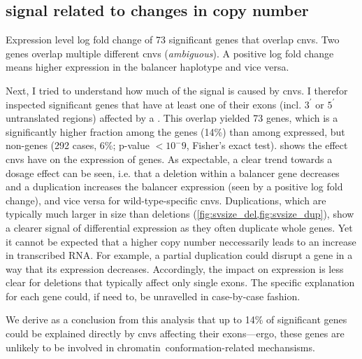 \subsection{\texorpdfstring{\ase}{ASE} signal related to changes in copy number}
\label{sec:balancer_ase_cnvs}

%
%
    {Expression level log fold change of 73 significant \ase genes that overlap
    \acp{cnv}. Two genes overlap multiple different \acp{cnv} (\textit{ambiguous}).
    A positive log fold change means higher expression in the balancer haplotype
    and vice versa.}

Next, I tried to understand how much of the \ase signal is caused by \acp{cnv}.
I therefor inspected significant \ase genes that have at least one of their
exons (incl. $3^\prime$ or $5^\prime$ untranslated regions) affected by a \cnv.
This overlap yielded 73 genes, which is a significantly higher fraction
among the \ase genes (14\%) than among expressed, but non-\ase genes (292 cases,
6\%; p-value $<10^-9$, Fisher's exact test).  shows
the effect \acp{cnv} have on the expression of \ase genes. As expectable, a
clear trend towards a dosage effect can be seen, i.e. that a deletion within a
balancer gene decreases and a duplication increases the balancer
expression (seen by a positive log fold change), and vice versa for
wild-type-specific \acp{cnv}. Duplications, which are typically much larger in
size than deletions (\cref{fig:svsize_del,fig:svsize_dup}), show a
clearer signal of differential expression as they often duplicate whole genes.
Yet it cannot be expected that a higher copy number neccessarily leads to an
increase in transcribed RNA. For example, a partial duplication could disrupt a
gene in a way that its expression decreases. Accordingly, the impact on
expression is less clear for deletions that typically affect only single exons.
The specific explanation for each gene could, if need to, be unravelled
in case-by-case fashion.

We derive as a conclusion from this analysis that up to 14\% of significant \ase
genes could be explained directly by \acp{cnv} affecting their exons---ergo,
these genes are unlikely to be involved in chromatin\ conformation-related
mechansisms.






